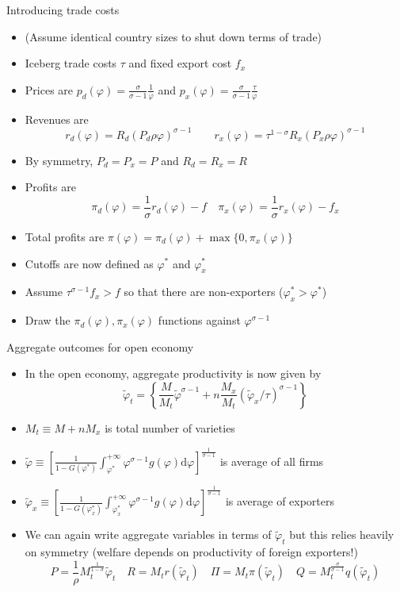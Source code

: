 \documentclass[10pt,notes=hide]{beamer}
\begin{document}
\begin{frame}{Introducing trade costs}
\begin{itemize}
\item (Assume identical country sizes to shut down terms of trade)
\item Iceberg trade costs $\tau$ and fixed export cost $f_x$
\item Prices are
$p_d(\varphi) = \frac{\sigma}{\sigma-1} \frac{1}{\varphi}$
and
$p_x(\varphi) = \frac{\sigma}{\sigma-1} \frac{\tau}{\varphi}$
\item Revenues are
$$r_d(\varphi) = R_d \left(P_d\rho\varphi\right)^{\sigma-1}
\qquad
r_x(\varphi) = \tau^{1-\sigma}R_x \left(P_x\rho\varphi\right)^{\sigma-1}$$
\item By symmetry, $P_d = P_x = P$ and $R_d = R_x = R$
\item Profits are
$$
\pi_d(\varphi) = \frac{1}{\sigma} r_d(\varphi) - f
\quad 
\pi_x(\varphi) = \frac{1}{\sigma} r_x(\varphi) - f_x
$$
\item Total profits are $\pi(\varphi) = \pi_d(\varphi) + \max\{0,\pi_x(\varphi)\}$
\item Cutoffs are now defined as $\varphi^*$ and $\varphi^*_x$
\item Assume $\tau^{\sigma-1}f_x > f$ so that there are non-exporters ($\varphi^*_x>\varphi^*$)
\item Draw the $\pi_d(\varphi), \pi_x(\varphi)$ functions against $\varphi^{\sigma-1}$
\end{itemize}
\end{frame}
\begin{frame}{Aggregate outcomes for open economy}
\begin{itemize}
\item In the open economy, aggregate productivity is now given by
$$
\tilde{\varphi}_t = 
\left\{\frac{M}{M_t}\tilde{\varphi}^{\sigma-1} + n \frac{M_x}{M_t} (\tilde{\varphi}_x/\tau)^{\sigma-1} \right\}
$$
\item $M_t \equiv M + n M_x$ is total number of varieties
\item $\tilde{\varphi} \equiv \left[ \frac{1}{1-G(\varphi^*)} \int_{\varphi^*}^{+\infty} \varphi^{\sigma-1} g(\varphi) \textrm{d} \varphi \right]^{\frac{1}{\sigma-1}}$ is average of all firms
\item $\tilde{\varphi}_x \equiv \left[ \frac{1}{1-G(\varphi_x^*)} \int_{\varphi_x^*}^{+\infty} \varphi^{\sigma-1} g(\varphi) \textrm{d} \varphi \right]^{\frac{1}{\sigma-1}}$ is average of exporters
\item We can again write aggregate variables in terms of $\tilde{\varphi}_t$ but this relies heavily on symmetry (welfare depends on productivity of foreign exporters!)
$$
P = \frac{1}{\rho} M_t^{\frac{1}{1-\sigma}} \tilde{\varphi}_t
\quad 
R = M_t r(\tilde{\varphi}_t)
\quad
\Pi = M_t \pi(\tilde{\varphi}_t)
\quad
Q = M_t^{\frac{\sigma}{\sigma-1}} q(\tilde{\varphi}_t)
$$
\end{itemize}
\end{frame}
\end{document}
